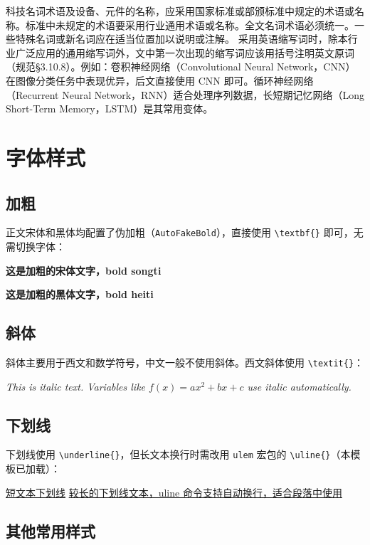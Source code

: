 科技名词术语及设备、元件的名称，应采用国家标准或部颁标准中规定的术语或名称。标准中未规定的术语要采用行业通用术语或名称。全文名词术语必须统一。一些特殊名词或新名词应在适当位置加以说明或注解。
采用英语缩写词时，除本行业广泛应用的通用缩写词外，文中第一次出现的缩写词应该用括号注明英文原词（规范§3.10.8）。例如：卷积神经网络（Convolutional Neural Network，CNN）在图像分类任务中表现优异，后文直接使用 CNN 即可。循环神经网络（Recurrent Neural Network，RNN）适合处理序列数据，长短期记忆网络（Long Short-Term Memory，LSTM）是其常用变体。

\section{字体样式}
\label{sec:font}

\subsection{加粗}

正文宋体和黑体均配置了伪加粗（\texttt{AutoFakeBold}），直接使用 \texttt{\textbackslash textbf\{\}} 即可，无需切换字体：

\textbf{这是加粗的宋体文字，bold songti}

{\heiti\textbf{这是加粗的黑体文字，bold heiti}}

\subsection{斜体}

斜体主要用于西文和数学符号，中文一般不使用斜体。西文斜体使用 \texttt{\textbackslash textit\{\}}：

\textit{This is italic text. Variables like $f(x) = ax^2 + bx + c$ use italic automatically.}

\subsection{下划线}

下划线使用 \texttt{\textbackslash underline\{\}}，但长文本换行时需改用 \texttt{ulem} 宏包的 \texttt{\textbackslash uline\{\}}（本模板已加载）：

\underline{短文本下划线} \quad \uline{较长的下划线文本，uline 命令支持自动换行，适合段落中使用}

\subsection{其他常用样式}

